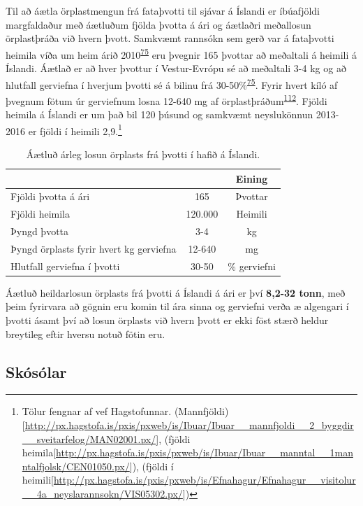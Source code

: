 \documentclass[icelandic,]{book}
\let\rmarkdownfootnote\footnote%
\def\footnote{\protect\rmarkdownfootnote}
\begin{document}
Til að áætla örplastmengun frá fataþvotti til sjávar á Íslandi er íbúafjöldi margfaldaður með áætluðum fjölda þvotta á ári og áætlaðri meðallosun örplastþráða við hvern þvott. Samkvæmt rannsókn sem gerð var á fataþvotti heimila víða um heim árið 2010\textsuperscript{\protect\hyperlink{ref-Pakula2010}{75}} eru þvegnir 165 þvottar að meðaltali á heimili á Íslandi. Áætlað er að hver þvottur í Vestur-Evrópu sé að meðaltali 3-4 kg og að hlutfall gerviefna í hverjum þvotti sé á bilinu frá 30-50\%\textsuperscript{\protect\hyperlink{ref-Pakula2010}{75}}. Fyrir hvert kíló af þvegnum fötum úr gerviefnum losna 12-640 mg af örplastþráðum\textsuperscript{\protect\hyperlink{ref-magnusson2016swedish}{112}}. Fjöldi heimila á Íslandi er um það bil 120 þúsund og samkvæmt neyslukönnun 2013-2016 er fjöldi í heimili 2,9.\footnote{Tölur fengnar af vef Hagstofunnar. (Mannfjöldi){[}\url{http://px.hagstofa.is/pxis/pxweb/is/Ibuar/Ibuar__mannfjoldi__2_byggdir__sveitarfelog/MAN02001.px/}{]}, (fjöldi heimila{[}\url{http://px.hagstofa.is/pxis/pxweb/is/Ibuar/Ibuar__manntal__1manntalfjolsk/CEN01050.px/}{]}), (fjöldi í heimili{[}\url{http://px.hagstofa.is/pxis/pxweb/is/Efnahagur/Efnahagur__visitolur__4a_neyslarannsokn/VIS05302.px/}{]})}

\begin{table}[t]

\caption{\label{tab:unnamed-chunk-13}Áætluð árleg losun örplasts frá þvotti í hafið á Íslandi.}
\centering
\begin{tabular}{lcc}
\toprule
  &  & Eining\\
\midrule
Fjöldi þvotta á ári & 165 & Þvottar\\
Fjöldi heimila & 120.000 & Heimili\\
Þyngd þvotta & 3-4 & kg\\
Þyngd örplasts fyrir hvert kg gerviefna & 12-640 & mg\\
Hlutfall gerviefna í þvotti & 30-50 & \% gerviefni\\
\bottomrule
\end{tabular}
\end{table}

Áætluð heildarlosun örplasts frá þvotti á Íslandi á ári er því \textbf{8,2-32 tonn}, með þeim fyrirvara að gögnin eru komin til ára sinna og gerviefni verða æ algengari í þvotti ásamt því að losun örplasts við hvern þvott er ekki föst stærð heldur breytileg eftir hversu notuð fötin eru.

\hypertarget{skosolar}{%
\subsection*{Skósólar}\label{skosolar}}
\end{document}
